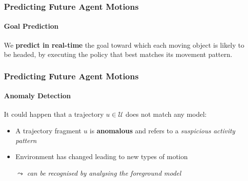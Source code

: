 \begin{frame}
	\frametitle{Predicting Future Agent Motions}
	\framesubtitle{Goal Prediction}
	
	\Large
	
	\vspace{0.25cm}
	
	We \textbf{predict in real-time} the goal toward which each moving object is likely to be headed,
	by executing the policy that best matches its movement pattern.
	
	\vspace{-0.1cm}
	
	\begin{center}
	\end{center}
\end{frame}

\begin{frame}
	\frametitle{Predicting Future Agent Motions}
	\framesubtitle{Anomaly Detection}
	
	\LARGE
	
	\vspace{0.5cm}
	
	It could happen that a trajectory $ u \in \mathcal{U} $ does not match any model:
	\begin{itemize}
		\item A trajectory fragment $ u $ is \textbf{anomalous} and refers to a \emph{suspicious
			  activity pattern}
		\item Environment has changed leading to new types of motion
			  \vspace{-0.25cm}
			  \begin{tabbing}
				  \hspace{0.3cm}
				  \large
				  $ \leadsto $ \emph{can be recognised by analysing the foreground model}
			  \end{tabbing}
	\end{itemize}
\end{frame}

